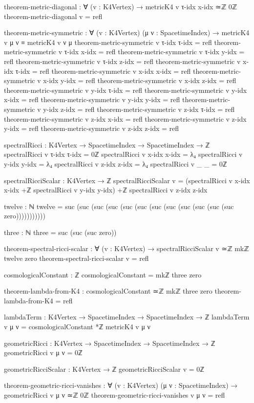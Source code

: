 \documentclass[11pt,a4paper]{book}
\begin{document}
\begin{code}
theorem-metric-diagonal : ∀ (v : K4Vertex) → metricK4 v τ-idx x-idx ≃ℤ 0ℤ
theorem-metric-diagonal v = refl

theorem-metric-symmetric : ∀ (v : K4Vertex) (μ ν : SpacetimeIndex) → 
                           metricK4 v μ ν ≡ metricK4 v ν μ
theorem-metric-symmetric v τ-idx τ-idx = refl
theorem-metric-symmetric v τ-idx x-idx = refl
theorem-metric-symmetric v τ-idx y-idx = refl
theorem-metric-symmetric v τ-idx z-idx = refl
theorem-metric-symmetric v x-idx τ-idx = refl
theorem-metric-symmetric v x-idx x-idx = refl
theorem-metric-symmetric v x-idx y-idx = refl
theorem-metric-symmetric v x-idx z-idx = refl
theorem-metric-symmetric v y-idx τ-idx = refl
theorem-metric-symmetric v y-idx x-idx = refl
theorem-metric-symmetric v y-idx y-idx = refl
theorem-metric-symmetric v y-idx z-idx = refl
theorem-metric-symmetric v z-idx τ-idx = refl
theorem-metric-symmetric v z-idx x-idx = refl
theorem-metric-symmetric v z-idx y-idx = refl
theorem-metric-symmetric v z-idx z-idx = refl

spectralRicci : K4Vertex → SpacetimeIndex → SpacetimeIndex → ℤ
spectralRicci v τ-idx τ-idx = 0ℤ
spectralRicci v x-idx x-idx = λ₄
spectralRicci v y-idx y-idx = λ₄
spectralRicci v z-idx z-idx = λ₄
spectralRicci v _     _     = 0ℤ

spectralRicciScalar : K4Vertex → ℤ
spectralRicciScalar v = (spectralRicci v x-idx x-idx +ℤ
                         spectralRicci v y-idx y-idx) +ℤ
                         spectralRicci v z-idx z-idx

twelve : ℕ
twelve = suc (suc (suc (suc (suc (suc (suc (suc (suc (suc (suc (suc zero)))))))))))

three : ℕ
three = suc (suc (suc zero))

theorem-spectral-ricci-scalar : ∀ (v : K4Vertex) → 
  spectralRicciScalar v ≃ℤ mkℤ twelve zero
theorem-spectral-ricci-scalar v = refl

cosmologicalConstant : ℤ
cosmologicalConstant = mkℤ three zero

theorem-lambda-from-K4 : cosmologicalConstant ≃ℤ mkℤ three zero
theorem-lambda-from-K4 = refl

lambdaTerm : K4Vertex → SpacetimeIndex → SpacetimeIndex → ℤ
lambdaTerm v μ ν = cosmologicalConstant *ℤ metricK4 v μ ν

geometricRicci : K4Vertex → SpacetimeIndex → SpacetimeIndex → ℤ
geometricRicci v μ ν = 0ℤ

geometricRicciScalar : K4Vertex → ℤ
geometricRicciScalar v = 0ℤ

theorem-geometric-ricci-vanishes : ∀ (v : K4Vertex) (μ ν : SpacetimeIndex) →
  geometricRicci v μ ν ≃ℤ 0ℤ
theorem-geometric-ricci-vanishes v μ ν = refl


\end{code}
\end{document}
